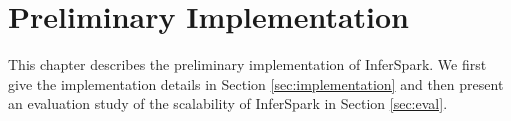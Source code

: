 \chapter{Preliminary Implementation}
\label{chap:impl_and_eval}

This chapter describes the preliminary implementation of InferSpark. We first
give the implementation details in Section \ref{sec:implementation} and then
present an evaluation study of the scalability of InferSpark in Section \ref{sec:eval}.




